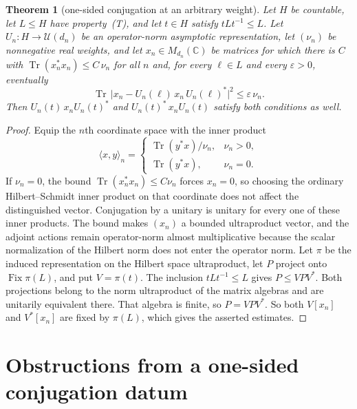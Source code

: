 \documentclass[11pt]{amsart}
\newcommand{\leanverified}[2]{\ignorespaces}
\newtheorem{theorem}{Theorem}[section]
\theoremstyle{definition}
\theoremstyle{remark}
\theoremstyle{plain}
\newcommand{\C}{\mathbb C}
\newcommand{\U}{\mathcal U}
\begin{document}
\begin{theorem}[one-sided conjugation at an arbitrary weight]
\label{thm:transport-variants}
Let $H$ be countable, let $L\leq H$ have property~\textup{(T)}, and let
$t\in H$ satisfy $tLt^{-1}\leq L$.  Let $U_n\colon H\to\U(d_n)$ be an
operator-norm asymptotic representation, let $(\nu_n)$ be nonnegative
real weights, and let $x_n\in M_{d_n}(\C)$ be matrices for which there is
$C$ with $\operatorname{Tr}(x_n^*x_n)\le C\,\nu_n$ for all $n$ and,
for every $\ell\in L$ and every $\varepsilon>0$, eventually
\[
 \operatorname{Tr}\,\bigl|x_n-U_n(\ell)\,x_n\,
   U_n(\ell)^*\bigr|^2\le\varepsilon\,\nu_n.
\]
Then $U_n(t)\,x_nU_n(t)^*$ and $U_n(t)^*\,x_nU_n(t)$ satisfy both
conditions as well.
\leanverified{Sofic/ManuscriptSubgroupSpecializations}{GroupApproximation.ManuscriptExactWrappers.manuscriptWeightedTransportSubgroup}
\end{theorem}

\begin{proof}
Equip the $n$th coordinate space with the inner product
\[
 \langle x,y\rangle_n=
 \begin{cases}
  \operatorname{Tr}(y^*x)/\nu_n,&\nu_n>0,\\
  \operatorname{Tr}(y^*x),&\nu_n=0.
 \end{cases}
\]
If $\nu_n=0$, the bound $\operatorname{Tr}(x_n^*x_n)\le C\nu_n$
forces $x_n=0$, so choosing the ordinary Hilbert--Schmidt
inner product on that coordinate does not affect the distinguished
vector.  Conjugation by a unitary is unitary for every one of these
inner products.  The bound makes $(x_n)$ a bounded ultraproduct vector,
and the adjoint actions remain operator-norm almost multiplicative
because the scalar normalization of the Hilbert norm does not enter
the operator norm.  Let $\pi$ be the induced representation on the Hilbert
space ultraproduct, let $P$ project onto $\operatorname{Fix}\pi(L)$, and put
$V=\pi(t)$.  The inclusion $tLt^{-1}\leq L$ gives $P\leq VPV^*$.
Both projections belong to the norm ultraproduct of the matrix algebras and
are unitarily equivalent there.  That algebra is finite, so $P=VPV^*$.
So both $V[x_n]$ and $V^*[x_n]$ are fixed by $\pi(L)$, which gives the
asserted estimates.
\end{proof}

\section{Obstructions from a one-sided conjugation datum}\label{sec:conj}
\end{document}
